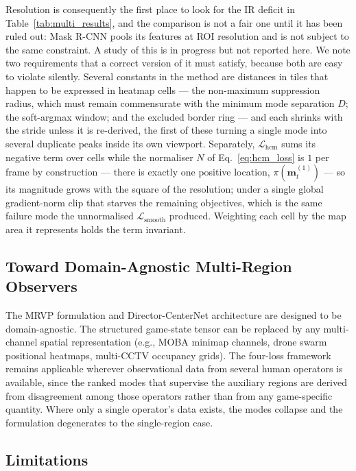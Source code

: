\documentclass[preprint,12pt]{elsarticle}
\begin{document}
Resolution is consequently the first place to look for the IR deficit in
Table~\ref{tab:multi_results}, and the comparison is not a fair one until it
has been ruled out: Mask R-CNN pools its features at ROI resolution and is not
subject to the same constraint. A study of this is in progress but not
reported here. We note two requirements that a correct version of it must
satisfy, because both are easy to violate silently. Several constants in the
method are distances in tiles that happen to be expressed in heatmap cells —
the non-maximum suppression radius, which must remain commensurate with the
minimum mode separation $D$; the soft-argmax window; and the excluded border
ring — and each shrinks with the stride unless it is re-derived, the first of
these turning a single mode into several duplicate peaks inside its own
viewport. Separately, $\mathcal{L}_{\text{hcm}}$ sums its negative term over
cells while the normaliser $N$ of Eq.~\ref{eq:hcm_loss} is $1$ per frame by
construction — there is exactly one positive location,
$\pi(\mathbf{m}^{(1)}_t)$ — so its magnitude grows
with the square of the resolution; under a single global gradient-norm clip
that starves the remaining objectives, which is the same failure mode the
unnormalised $\mathcal{L}_{\text{smooth}}$ produced. Weighting each cell by the
map area it represents holds the term invariant.

\subsection{Toward Domain-Agnostic Multi-Region Observers}

The MRVP formulation and Director-CenterNet architecture are 
designed to be domain-agnostic. The structured game-state tensor can be 
replaced by any multi-channel spatial representation (e.g., MOBA minimap 
channels, drone swarm positional heatmaps, multi-CCTV occupancy grids). 
The four-loss framework remains applicable wherever observational data from
several human operators is available, since the ranked modes that supervise the
auxiliary regions are derived from disagreement among those operators rather
than from any game-specific quantity. Where only a single operator's data
exists, the modes collapse and the formulation degenerates to the single-region
case.

\subsection{Limitations}
\label{subsec:limitations}
\end{document}
